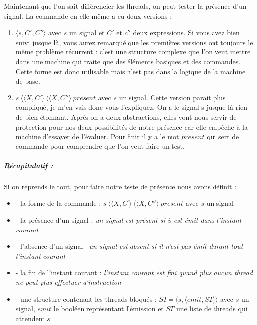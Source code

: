 \documentclass[10pt,a4paper]{article}
\begin{document}
					Maintenant que l'on sait différencier les threads, on peut tester la présence d'un signal. La commande en elle-même a eu deux versions :
					\begin{enumerate}
						\item $\langle s,C',C''\rangle$ avec $s$ un signal et $C'$ et $c''$ deux expressions. Si vous avez bien suivi jusque là, vous aurez remarqué que les premières versions ont toujours le même problème récurrent : c'est une structure complexe que l'on veut mettre dans une machine qui traite que des éléments basiques et des commandes. Cette forme est donc utilisable mais n'est pas dans la logique de la machine de base.
						\item $s~\langle\langle X,C'\rangle~\langle\langle X,C''\rangle~present$ avec $s$ un signal. Cette version parait plus compliqué, je m'en vais donc vous l'expliquez. On a le signal s jusque là rien de bien étonnant. Après on a deux abstractions, elles vont nous servir de protection pour nos deux possibilités de notre présence car elle empêche à la machine d'essayer de l'évaluer. Pour finir il y a le mot $present$ qui sert de commande pour comprendre que l'on veut faire un test.
					\end{enumerate} 
					\bigbreak
						
						
					\subparagraph{Récapitulatif :} Si on reprends le tout, pour faire notre teste de présence nous avons définit :
					\begin{itemize}
						\item[] - la forme de la commande : $s~\langle\langle X,C'\rangle~\langle\langle X,C''\rangle~present$ avec $s$ un signal
						\item[] - la présence d'un signal : \textit{un signal est présent si il est émit dans l'instant courant}
						\item[] - l'absence d'un signal : \textit{un signal est absent si il n'est pas émit durant tout l'instant courant}
						\item[] - la fin de l'instant courant : \textit{l'instant courant est fini quand plus aucun thread ne peut plus effectuer d'instruction}
						\item[] - une structure contenant les threads bloqués : $SI = \langle s , \langle emit , ST \rangle\rangle$ avec $s$ un signal, $emit$ le booléen représentant l'émission et $ST$ une liste de threads qui attendent $s$
					\end{itemize}
					\bigbreak
					\bigbreak
						
						
						
\end{document}
